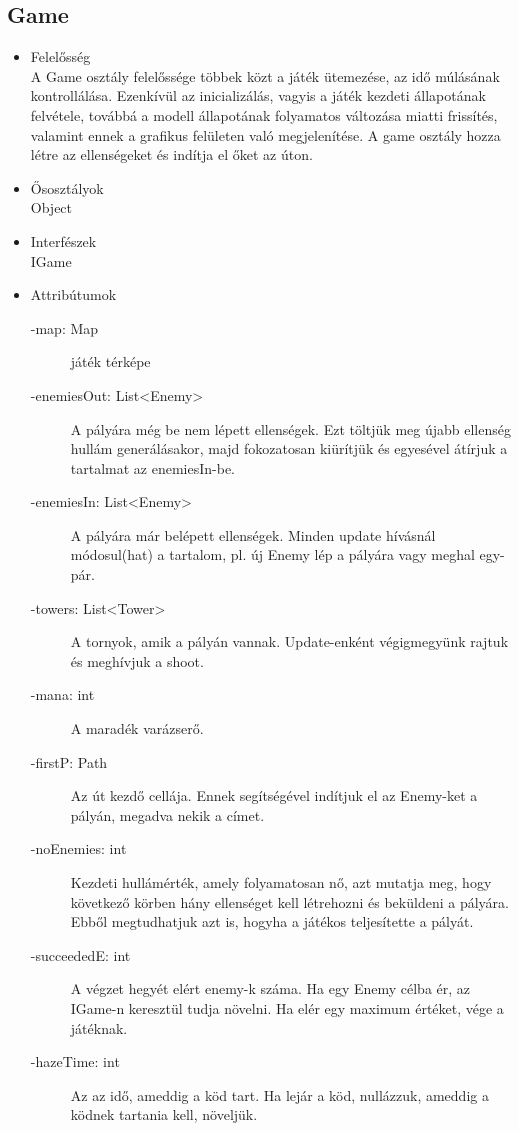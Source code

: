 \subsection{Game}
\begin{itemize}
\item Felelősség\\
A Game osztály felelőssége többek közt a játék ütemezése, az idő múlásának kontrollálása. Ezenkívül az inicializálás, vagyis a játék kezdeti állapotának felvétele, továbbá a modell állapotának folyamatos változása miatti frissítés, valamint ennek a grafikus felületen való megjelenítése. A game osztály hozza létre az ellenségeket és indítja el őket az úton.
\item Ősosztályok\\
Object
\item Interfészek\\
IGame
\item Attribútumok
	\begin{description}
		\item[-map: Map] játék térképe
\item[-enemiesOut: List<Enemy>] A pályára még be nem lépett ellenségek. Ezt töltjük meg újabb ellenség hullám generálásakor, majd fokozatosan kiürítjük és egyesével átírjuk a tartalmat az enemiesIn-be. 
\item[-enemiesIn: List<Enemy>] A pályára már belépett ellenségek. Minden update hívásnál módosul(hat) a tartalom, pl. új Enemy lép a pályára vagy meghal egy-pár. 
\item[-towers: List<Tower>] A tornyok, amik a pályán vannak. Update-enként végigmegyünk rajtuk és meghívjuk a shoot. 
\item[-mana: int] A maradék varázserő. 
\item[-firstP: Path] Az út kezdő cellája. Ennek segítségével indítjuk el az Enemy-ket a pályán, megadva nekik a címet. 
\item[-noEnemies: int] Kezdeti hullámérték, amely folyamatosan nő, azt mutatja meg, hogy következő körben hány ellenséget kell létrehozni és beküldeni a pályára. Ebből megtudhatjuk azt is, hogyha a játékos teljesítette a pályát. 
\item[-succeededE: int] A végzet hegyét elért enemy-k száma. Ha egy Enemy célba ér, az IGame-n keresztül tudja növelni. Ha elér egy maximum értéket, vége a játéknak. 
\item[-hazeTime: int] Az az idő, ameddig a köd tart. Ha lejár a köd, nullázzuk, ameddig a ködnek tartania kell, növeljük. 




\end{description}
\end{itemize}
